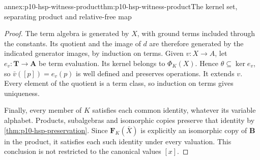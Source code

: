 \begin{annexitem}{annex:p10-hsp-witness-product}{thm:p10-hsp-witness-product}{The kernel set, separating product and relative-free map}
\begin{proof}
The term algebra is generated by \(X\), with ground
terms included through the constants. Its quotient
and the image of \(d\) are therefore generated by
the indicated generator images, by induction on terms.
Given \(v:X\to A\), let \(e_v:\mathbf T\to\mathbf A\)
be term evaluation. Its kernel belongs to \(\Phi_K(X)\).
Hence \(\theta\subseteq\ker e_v\), so
\(\bar v([p])=e_v(p)\) is well defined and preserves
operations. It extends \(v\).
Every element of the quotient is a term class,
so induction on terms gives uniqueness.

Finally, every member of \(K\) satisfies each common
identity, whatever its variable alphabet. Products,
subalgebras and isomorphic copies preserve that
identity by \cref{thm:p10-hsp-preservation}.
Since \(\mathbf F_K(\bar X)\) is explicitly an
isomorphic copy of \(\mathbf B\) in the product,
it satisfies each such identity under every valuation.
This conclusion is not restricted to the canonical
values \([x]\).
\end{proof}
\end{annexitem}


